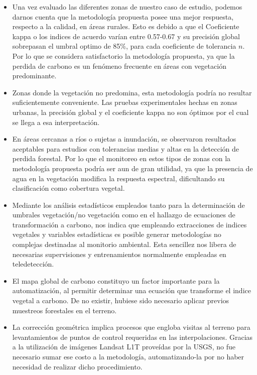 \begin{itemize}
\item Una vez evaluado las diferentes zonas de nuestro caso de estudio, podemos darnos cuenta que la metodolog\'ia propuesta posee una mejor respuesta, respecto a la calidad, en \'areas rurales. Esto es debido a que el Coeficiente kappa o los indices de acuerdo var\'ian entre 0.57-0.67 y su precisi\'on global sobrepasan el umbral optimo de 85\%, para cada coeficiente de tolerancia $ n $. Por lo que se considera satisfactorio la metodolog\'ia propuesta, ya que la perdida de carbono es un fen\'omeno frecuente en \'areas con vegetaci\'on predominante.

\item Zonas donde la vegetaci\'on no predomina, esta metodolog\'ia podr\'ia no resultar suficientemente conveniente. Las pruebas experimentales hechas en zonas urbanas, la precisi\'on global y el coeficiente kappa no son \'optimos por el cual se llega a esa interpretaci\'on.

\item En \'areas cercanas a r\'ios o sujetas a inundaci\'on, se observaron resultados aceptables para  estudios con tolerancias medias y altas en la detecci\'on de perdida forestal. Por lo que el monitoreo en estos tipos de zonas con la metodolog\'ia propuesta podr\'ia ser aun de gran utilidad, ya que la presencia de agua en la vegetaci\'on modifica la respuesta espectral, dificultando su clasificaci\'on como cobertura vegetal.

\item Mediante los an\'alisis estad\'isticos empleados tanto para la determinaci\'on de umbrales vegetaci\'on/no vegetaci\'on como en el hallazgo de ecuaciones de transformaci\'on a carbono, nos indica que empleando extracciones de indices vegetales y variables estad\'isticas es posible generar metodolog\'ias no complejas destinadas al monitorio ambiental. Esta sencillez nos libera de necesarias supervisiones y entrenamientos normalmente empleadas en teledetecci\'on.

\item El mapa global de carbono \cite{saatchi2011benchmark} constituyo un factor importante para la automatizaci\'on, al permitir determinar una ecuaci\'on que transforme el indice vegetal a carbono. De no existir, hubiese sido necesario aplicar previos muestreos forestales en el terreno.

\item La correcci\'on geom\'etrica implica procesos que engloba visitas al terreno para levantamientos de puntos de control requeridas en las interpolaciones. Gracias a la utilizaci\'on de im\'agenes Landsat L1T prove\'idas por la USGS, no fue necesario sumar ese costo a la metodolog\'ia, automatizando-la por no haber necesidad de realizar dicho procedimiento.

\end{itemize}

